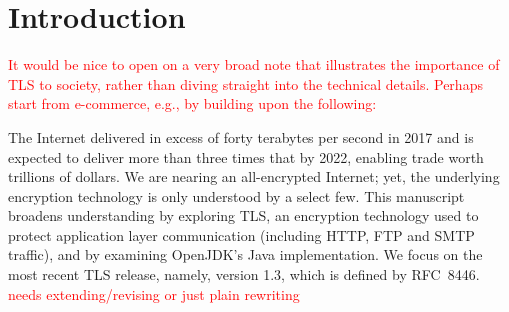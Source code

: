 \section{Introduction}\label{sec:intro}

\ifPresentationNotes
\textcolor{red}{
 It would be nice to open on a very broad note that illustrates the importance
 of TLS to society, rather than diving straight into the technical details.
 Perhaps start from e-commerce, e.g., by building upon the following:
}
%
%
\begin{comment}
The e-commerce market was valued at over twenty trillion US dollars in 2016
and is forecast to double in value by 2022, with business-to-business
sales accounting for over eighty percent of the market share. 
That market is reliant on secure communication, which can be achieved using
TLS.
\end{comment}
%
%
%
The Internet delivered in excess of forty terabytes per second in 2017 
and is expected to deliver more than three times that by 2022, %
enabling trade worth trillions of dollars. %
\fi
%
We are nearing an all-encrypted Internet; 
yet, the underlying encryption technology %
is only understood by a select few. 
This manuscript broadens understanding by exploring TLS, an encryption technology 
used to protect application layer communication (including HTTP, FTP and SMTP traffic), 
and by examining OpenJDK's Java implementation. 
We focus on the most recent TLS release, namely, version 1.3, which is defined by RFC~8446.
\ifPresentationNotes
\textcolor{red}{needs extending/revising or just plain rewriting}
\fi

